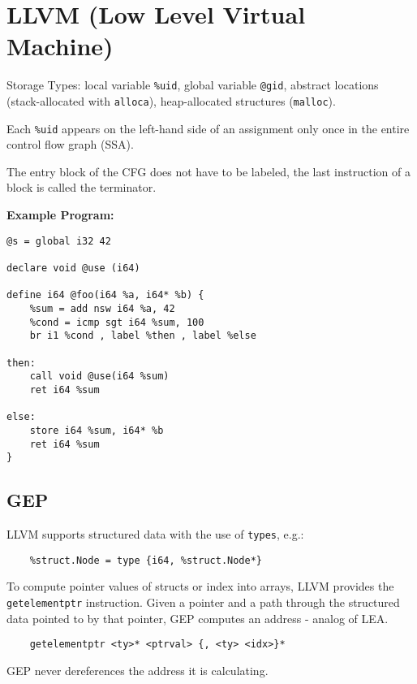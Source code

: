 \section*{LLVM (Low Level Virtual Machine)}

Storage Types: local variable \texttt{\%uid}, global variable \texttt{@gid}, abstract locations (stack-allocated with \texttt{alloca}), heap-allocated structures (\texttt{malloc}).\medskip

Each \texttt{\%uid} appears on the left-hand side of an assignment only once in the entire control flow graph (SSA).\medskip

The entry block of the CFG does not have to be labeled, the last instruction of a block is called the terminator. \medskip

\textbf{Example Program:}
\begin{lstlisting}
@s = global i32 42

declare void @use (i64)

define i64 @foo(i64 %a, i64* %b) { 
	%sum = add nsw i64 %a, 42
	%cond = icmp sgt i64 %sum, 100
	br i1 %cond , label %then , label %else
	
then:
	call void @use(i64 %sum) 
	ret i64 %sum
	
else:
	store i64 %sum, i64* %b 
	ret i64 %sum
}
\end{lstlisting}

\subsection*{GEP}

LLVM supports structured data with the use of \texttt{types}, e.g.:\medskip

\begin{lstlisting}
	%struct.Node = type {i64, %struct.Node*}
\end{lstlisting}\medskip

To compute pointer values of structs or index into arrays, LLVM provides the \texttt{getelementptr} instruction. Given a pointer and a path through the structured data pointed to by that pointer, GEP computes an address - analog of LEA.\medskip

\begin{lstlisting}
	getelementptr <ty>* <ptrval> {, <ty> <idx>}* 
\end{lstlisting}\medskip

GEP never dereferences the address it is calculating.
